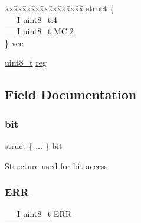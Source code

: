 \begin{DoxyCompactItemize}
\begin{tabbing}
\end{tabbing}\item 
\begin{tabbing}
xx\=xx\=xx\=xx\=xx\=xx\=xx\=xx\=xx\=\kill
struct \{\\
\>\mbox{\hyperlink{core__cm0plus_8h_af63697ed9952cc71e1225efe205f6cd3}{\_\_I}} \mbox{\hyperlink{union_t_c___i_n_t_f_l_a_g___type_a5b4208c6f4c4a4290c4f2804d1eb1d5b}{uint8\_t}}:4\\
\>\mbox{\hyperlink{core__cm0plus_8h_af63697ed9952cc71e1225efe205f6cd3}{\_\_I}} \mbox{\hyperlink{union_t_c___i_n_t_f_l_a_g___type_a5b4208c6f4c4a4290c4f2804d1eb1d5b}{uint8\_t}} \mbox{\hyperlink{union_t_c___i_n_t_f_l_a_g___type_a8cea78f0033c16a73b18246c8c72ac78}{MC}}:2\\
\} \mbox{\hyperlink{union_t_c___i_n_t_f_l_a_g___type_ad838eaead1519fe0a87d9b6631d9c735}{vec}}\\

\end{tabbing}\item 
\mbox{\hyperlink{union_t_c___i_n_t_f_l_a_g___type_a5b4208c6f4c4a4290c4f2804d1eb1d5b}{uint8\+\_\+t}} \mbox{\hyperlink{union_t_c___i_n_t_f_l_a_g___type_a9428adc9af4653a2050e2536b55dec8d}{reg}}
\end{DoxyCompactItemize}


\subsection{Field Documentation}
\mbox{\label{union_t_c___i_n_t_f_l_a_g___type_aa629e8167fbca0cf3e215692b75c65fc}} 
\subsubsection{\texorpdfstring{bit}{bit}}
{\footnotesize\ttfamily struct \{ ... \}   bit}

Structure used for bit access \mbox{\label{union_t_c___i_n_t_f_l_a_g___type_a0dc2084c046851eefc1d94742580db25}} 
\subsubsection{\texorpdfstring{ERR}{ERR}}
{\footnotesize\ttfamily \mbox{\hyperlink{core__cm0plus_8h_af63697ed9952cc71e1225efe205f6cd3}{\+\_\+\+\_\+I}} \mbox{\hyperlink{union_t_c___i_n_t_f_l_a_g___type_a5b4208c6f4c4a4290c4f2804d1eb1d5b}{uint8\+\_\+t}} E\+RR}

